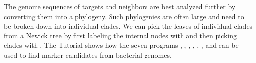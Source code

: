 The genome sequences of targets and neighbors are best analyzed
further by converting them into a phylogeny. Such phylogenies are
often large and need to be broken down into individual clades. We can
pick the leaves of individual clades from a Newick tree by first
labeling the internal nodes with  and then picking clades
with . The Tutorial shows how the seven
programs , , , ,
, , and  can be used
to find marker candidates from bacterial genomes.
